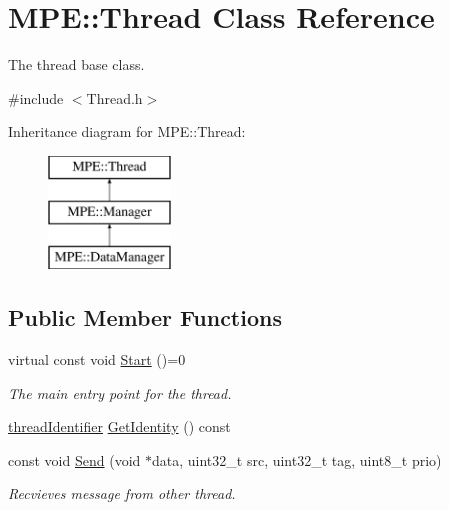 \hypertarget{class_m_p_e_1_1_thread}{}\section{M\+PE\+:\+:Thread Class Reference}
\label{class_m_p_e_1_1_thread}


The thread base class.  




{\ttfamily \#include $<$Thread.\+h$>$}

Inheritance diagram for M\+PE\+:\+:Thread\+:\begin{figure}[H]
\begin{center}
\leavevmode
\includegraphics[height=3.000000cm]{class_m_p_e_1_1_thread}
\end{center}
\end{figure}
\subsection*{Public Member Functions}
\begin{DoxyCompactItemize}
\item 
virtual const void \hyperlink{class_m_p_e_1_1_thread_a1bd133a96ec27c868b6bb758e11c0691}{Start} ()=0
\begin{DoxyCompactList}\small\item\em The main entry point for the thread. \end{DoxyCompactList}\item 
\hyperlink{namespace_m_p_e_a16447295e3105bd2ba2a9ea303566175}{thread\+Identifier} \hyperlink{class_m_p_e_1_1_thread_a736d2fc9d527a96419b428e018d225b3}{Get\+Identity} () const
\item 
const void \hyperlink{class_m_p_e_1_1_thread_a1e2ab6a736581d343719f0bba51aa9ad}{Send} (void $\ast$data, uint32\+\_\+t src, uint32\+\_\+t tag, uint8\+\_\+t prio)
\begin{DoxyCompactList}\small\item\em Recvieves message from other thread. \end{DoxyCompactList}\end{DoxyCompactItemize}
